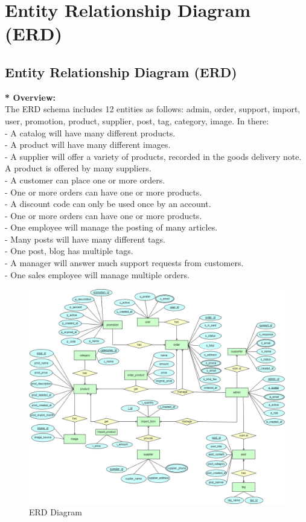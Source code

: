 \clearpage

\section{Entity Relationship Diagram (ERD)}
\subsection{Entity Relationship Diagram (ERD)}
\textbf{* Overview:}\\
The ERD schema includes 12 entities as follows: admin, 
order, support, import, user, promotion, product, supplier, post, tag, category, image. In there:\\
- A catalog will have many different products.\\
- A product will have many different images.\\
- A supplier will offer a variety of products, recorded in the goods delivery note. A product is offered by many suppliers.\\
- A customer can place one or more orders.\\
- One or more orders can have one or more products.\\
- A discount code can only be used once by an account.\\
- One or more orders can have one or more products.\\
- One employee will manage the posting of many articles.\\
- Many posts will have many different tags.\\
- One post, blog has multiple tags.\\
- A manager will answer much support requests from customers.\\
- One sales employee will manage multiple orders.\\

\begin{figure}[H]
  \centering
  \includegraphics[width=1.1\textwidth]{ERD.png}
  \caption{ERD Diagram}
  \label{fig:erd}
\end{figure}

